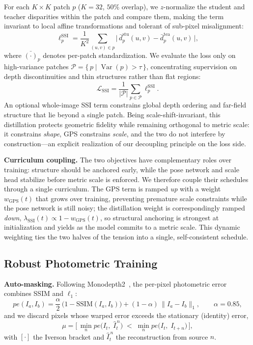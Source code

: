 For each \(K\times K\) patch \(p\) (\(K=32\), \(50\%\) overlap), we \(z\)-normalize the student and teacher disparities within the patch and compare them, making the term invariant to local affine transformations and tolerant of sub-pixel misalignment:
\begin{equation}
\ell^{\mathrm{SSI}}_{p}
= \frac{1}{K^{2}} \sum_{(u,v)\in p} \big|\,\bar d^{\mathrm{stu}}_{p}(u,v)-\bar d^{\mathrm{tea}}_{p}(u,v)\,\big|,
\end{equation}
where \(\bar{(\cdot)}_p\) denotes per-patch standardization. We evaluate the loss only on high-variance patches \(\mathcal{P}=\{\,p \mid \operatorname{Var}(p)>\tau\,\}\), concentrating supervision on depth discontinuities and thin structures rather than flat regions:
\begin{equation}
\mathcal{L}_{\mathrm{SSI}}
= \frac{1}{|\mathcal{P}|}\sum_{p\in\mathcal{P}} \ell^{\mathrm{SSI}}_{p}.
\end{equation}
An optional whole-image SSI term constrains global depth ordering and far-field structure that lie beyond a single patch. Being scale-shift-invariant, this distillation protects geometric fidelity while remaining orthogonal to metric scale: it constrains \emph{shape}, GPS constrains \emph{scale}, and the two do not interfere by construction---an explicit realization of our decoupling principle on the loss side.

\textbf{Curriculum coupling.} The two objectives have complementary roles over training: structure should be anchored early, while the pose network and scale head stabilize before metric scale is enforced. We therefore couple their schedules through a single curriculum. The GPS term is ramped \emph{up} with a weight \(w_{\mathrm{GPS}}(t)\) that grows over training, preventing premature scale constraints while the pose network is still noisy; the distillation weight is correspondingly ramped \emph{down}, \(\lambda_{\mathrm{SSI}}(t) \propto 1 - w_{\mathrm{GPS}}(t)\), so structural anchoring is strongest at initialization and yields as the model commits to a metric scale. This dynamic weighting ties the two halves of the tension into a single, self-consistent schedule.

\subsection{Robust Photometric Training}

\textbf{Auto-masking.} Following Monodepth2~\cite{godard2019digging}, the per-pixel photometric error combines SSIM and \(\ell_1\):
\begin{equation}
pe(I_a, I_b) = \frac{\alpha}{2}\,\big(1-\text{SSIM}(I_a, I_b)\big)
+ (1-\alpha)\,\lVert I_a - I_b \rVert_1,
\qquad \alpha = 0.85,
\label{eq:pe}
\end{equation}
and we discard pixels whose warped error exceeds the stationary (identity) error,
\begin{equation}
\mu = \Big[\, \min_{n} pe\!\big(I_t,\; \hat I_{t}^{\,n}\big) \;<\; \min_{n} pe\!\big(I_t,\; I_{t+n}\big) \,\Big],
\label{eq:auto-mask}
\end{equation}
with \([\cdot]\) the Iverson bracket and \(\hat I_{t}^{\,n}\) the reconstruction from source \(n\).

